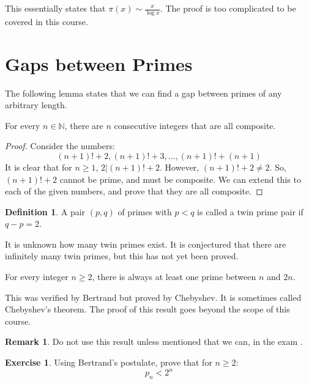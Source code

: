 \documentclass[12pt,letterpaper]{amsbook}
\theoremstyle{definition}
\newtheorem{definition}{Definition} %
\newtheorem*{remark}{Remark}
\newtheorem*{exercise}{Exercise}
\newcommand{\N}{\mathbb{N}}
\begin{document}
This essentially states that $\pi (x) \sim \frac{x}{\log{x}}$. The proof is too complicated to be covered in this course.

\section{Gaps between Primes}

The following lemma states that we can find a gap between primes of any arbitrary length.

\begin{lemma}
  For every $n \in \N$, there are $n$ consecutive integers that are all composite.  
\end{lemma}

\begin{proof}
  Consider the numbers:
  \[(n+1)! + 2, (n+1)! + 3, ... ,(n+1)!+(n+1)\]
  It is clear that for $n \geq 1$, $2|(n+1)!+2$. However, $(n+1)! + 2 \neq 2$. So, $(n+1)!+2$ cannot be prime, and must be composite. We can extend this to each of the given numbers, and prove that they are all composite.
\end{proof}

\begin{definition}
  A pair $(p,q)$ of primes with $p < q$ is called a twin prime pair if $q-p = 2$.  
\end{definition}

It is unknown how many twin primes exist. It is conjectured that there are infinitely many twin primes, but this has not yet been proved.

\begin{theorem}
  For every integer $n \geq 2$, there is always at least one prime between $n$ and $2n$.  
\end{theorem}

This was verified by Bertrand but proved by Chebyshev. It is sometimes called Chebyshev's theorem. The proof of this result goes beyond the scope of this course.

\begin{remark}
  Do not use this result unless mentioned that we can, in the exam .
\end{remark}

\begin{exercise}
  Using Bertrand's postulate, prove that for $n \geq 2$:
  \[p_n < 2^n\]
\end{exercise}
\end{document}
